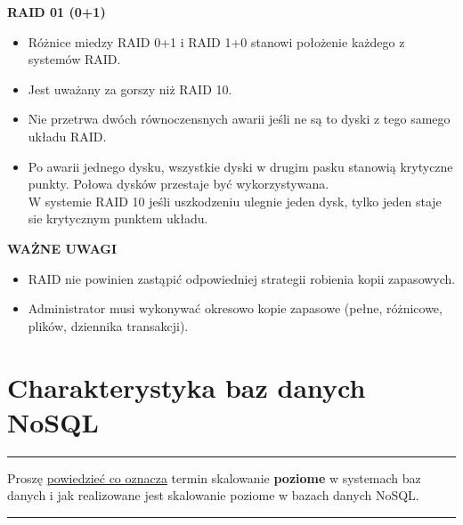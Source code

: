 \documentclass[a5paper,6pt]{article}
\newcommand{\horrule}[1]{\rule{\linewidth}{#1}}
\begin{document}
    \textbf{RAID 01 (0+1)}
    \begin{itemize}
        \item Różnice miedzy RAID 0+1 i RAID 1+0 stanowi położenie każdego z
              systemów RAID.
        \item Jest uważany za gorszy niż RAID 10.
        \item Nie przetrwa dwóch równoczensnych awarii jeśli ne są to dyski
              z tego samego układu RAID.
        \item Po awarii jednego dysku, wszystkie dyski w drugim pasku stanowią
              krytyczne punkty. Połowa dysków przestaje być wykorzystywana.\\
              W systemie RAID 10 jeśli uszkodzeniu ulegnie jeden dysk, tylko
              jeden staje sie krytycznym punktem układu.
    \end{itemize}

    \begin{center}
    \end{center}

    \textbf{WAŻNE UWAGI}
    \begin{itemize}
        \item RAID nie powinien zastąpić odpowiedniej strategii robienia kopii
              zapasowych.
        \item Administrator musi wykonywać okresowo kopie zapasowe (pełne,
              różnicowe, plików, dziennika transakcji).
    \end{itemize}


\pagebreak

    \section{Charakterystyka baz danych NoSQL} %
    \label{sec:charakterystyka_baz_danych_nosql}

    \horrule{0.5pt}
    Proszę \underline{powiedzieć co oznacza} termin skalowanie \textbf{poziome}
    w systemach baz danych i jak realizowane jest skalowanie poziome w bazach
    danych NoSQL.\\
    \horrule{0.5pt}
\end{document}
